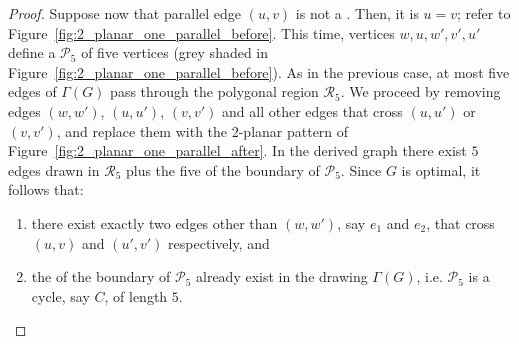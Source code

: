 \begin{proof}
Suppose now that parallel edge $(u,v)$ is not a \pe. Then, it is $u=v$; refer to Figure~\ref{fig:2_planar_one_parallel_before}. This time, vertices $w,u,w',v',u'$ define a \pp $\mathcal{P}_5$ of five vertices (grey shaded in Figure~\ref{fig:2_planar_one_parallel_before}). As in the previous case, at most five edges of $\Gamma(G)$ pass through the polygonal region $\mathcal{R}_5$. We proceed by removing  edges $(w,w')$, $(u,u')$, $(v,v')$ and all other edges that cross $(u,u')$ or $(v,v')$, and replace them with the $2$-planar pattern of Figure~\ref{fig:2_planar_one_parallel_after}. In the derived graph there exist $5$ edges drawn in $\mathcal{R}_5$ plus the five \pes of the boundary of $\mathcal{P}_5$. Since $G$ is optimal, it follows that:
\begin{enumerate}
\item there exist exactly two edges other than $(w,w')$, say $e_1$ and $e_2$, that cross $(u,v)$ and $(u',v')$ respectively, and
\item  the \pes of the boundary of  $\mathcal{P}_5$ already exist in the drawing $\Gamma(G)$, i.e. $\mathcal{P}_5$ is a cycle, say $C$, of length $5$. 
\end{enumerate}



\end{proof}
